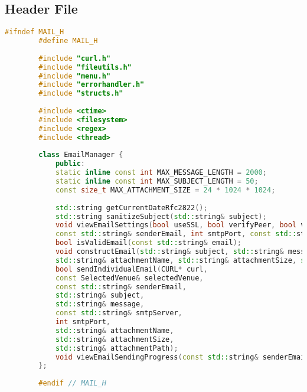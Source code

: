 \documentclass{article}
\begin{document}
	\subsection*{Header File}
	\begin{mdframed}[backgroundcolor=background, hidealllines=false, innerleftmargin=15pt, innerrightmargin=5pt, innertopmargin=0pt, innerbottommargin=-5pt, linecolor=accent]
	\begin{lstlisting}[language=C++]
		#ifndef MAIL_H
		#define MAIL_H
		
		#include "curl.h"
		#include "fileutils.h"
		#include "menu.h"
		#include "errorhandler.h"
		#include "structs.h"
		
		#include <ctime>
		#include <filesystem>
		#include <regex>
		#include <thread>
		
		class EmailManager {
			public:
			static inline const int MAX_MESSAGE_LENGTH = 2000;
			static inline const int MAX_SUBJECT_LENGTH = 50;
			const size_t MAX_ATTACHMENT_SIZE = 24 * 1024 * 1024;
			
			std::string getCurrentDateRfc2822();
			std::string sanitizeSubject(std::string& subject);
			void viewEmailSettings(bool useSSL, bool verifyPeer, bool verifyHost, bool verbose,  
			const std::string& senderEmail, int smtpPort, const std::string& smtpServer);
			bool isValidEmail(const std::string& email);
			void constructEmail(std::string& subject, std::string& message, std::string& attachmentPath, 
			std::string& attachmentName, std::string& attachmentSize, std::istream &in = std::cin);
			bool sendIndividualEmail(CURL* curl,
			const SelectedVenue& selectedVenue,
			const std::string& senderEmail,
			std::string& subject,
			std::string& message,
			const std::string& smtpServer,
			int smtpPort,
			std::string& attachmentName,
			std::string& attachmentSize,
			std::string& attachmentPath);
			void viewEmailSendingProgress(const std::string& senderEmail);
		};
		
		#endif // MAIL_H
	\end{lstlisting}
\end{mdframed}
\end{document}
